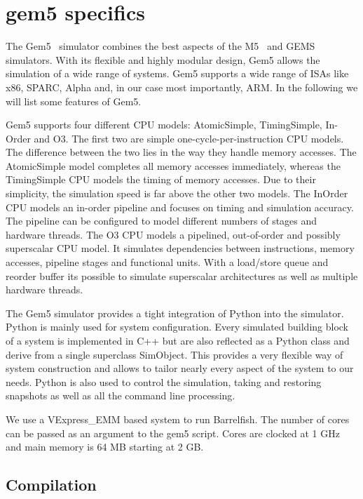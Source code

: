 \documentclass[a4paper,twoside]{report} %
\begin{document}
\section{gem5 specifics}

The Gem5~\cite{gem5:sigarch11} simulator combines the best aspects of
the M5~\cite{m5:micro06} and GEMS~\cite{gems:sigarch05}
simulators. With its flexible and highly modular design, Gem5 allows
the simulation of a wide range of systems. Gem5 supports a wide range
of ISAs like x86, SPARC, Alpha and, in our case most importantly,
ARM. In the following we will list some features of Gem5.

Gem5 supports four different CPU models: AtomicSimple, TimingSimple,
In-Order and O3. The first two are simple one-cycle-per-instruction
CPU models. The difference between the two lies in the way they handle
memory accesses. The AtomicSimple model completes all memory accesses
immediately, whereas the TimingSimple CPU models the timing of memory
accesses. Due to their simplicity, the simulation speed is far above
the other two models.  The InOrder CPU models an in-order pipeline and
focuses on timing and simulation accuracy. The pipeline can be
configured to model different numbers of stages and hardware threads.
The O3 CPU models a pipelined, out-of-order and possibly superscalar
CPU model. It simulates dependencies between instructions, memory
accesses, pipeline stages and functional units. With a load/store
queue and reorder buffer its possible to simulate superscalar
architectures as well as multiple hardware threads.

The Gem5 simulator provides a tight integration of Python into the
simulator. Python is mainly used for system configuration. Every
simulated building block of a system is implemented in C++ but are
also reflected as a Python class and derive from a single superclass
SimObject. This provides a very flexible way of system construction
and allows to tailor nearly every aspect of the system to our needs.
Python is also used to control the simulation, taking and restoring
snapshots as well as all the command line processing.

We use a VExpress\_EMM based system to run Barrelfish. The number of
cores can be passed as an argument to the gem5 script. Cores are
clocked at 1 GHz and main memory is 64 MB starting at 2 GB.

\subsection{Compilation}
\end{document}
